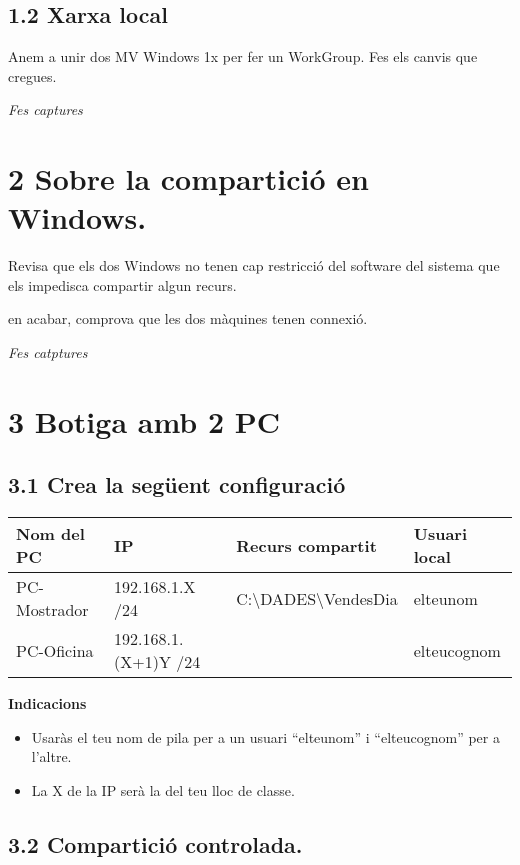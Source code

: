 \documentclass[
  a4paper,
]{article}
\begin{document}
\subsection{1.2 Xarxa local}\label{xarxa-local}

Anem a unir dos MV Windows 1x per fer un WorkGroup. Fes els canvis que
cregues.

\emph{Fes captures}

\section{2 Sobre la compartició en
Windows.}\label{sobre-la-comparticiuxf3-en-windows.}

Revisa que els dos Windows no tenen cap restricció del software del
sistema que els impedisca compartir algun recurs.

en acabar, comprova que les dos màquines tenen connexió.

\emph{Fes catptures}

\section{3 Botiga amb 2 PC}\label{botiga-amb-2-pc}

\subsection{3.1 Crea la següent
configuració}\label{crea-la-seguxfcent-configuraciuxf3}

\begin{longtable}[]{@{}llll@{}}
\toprule\noalign{}
Nom del PC & IP & Recurs compartit & Usuari local \\
\midrule\noalign{}
\endhead
\bottomrule\noalign{}
\endlastfoot
PC-Mostrador & 192.168.1.X /24 &
C:\textbackslash DADES\textbackslash VendesDia & elteunom \\
PC-Oficina & 192.168.1.(X+1)Y /24 & & elteucognom \\
\end{longtable}

\textbf{Indicacions}

\begin{itemize}
\item
  Usaràs el teu nom de pila per a un usuari ``elteunom'' i
  ``elteucognom'' per a l'altre.
\item
  La X de la IP serà la del teu lloc de classe.
\end{itemize}

\subsection{3.2 Compartició
controlada.}\label{comparticiuxf3-controlada.}
\end{document}
